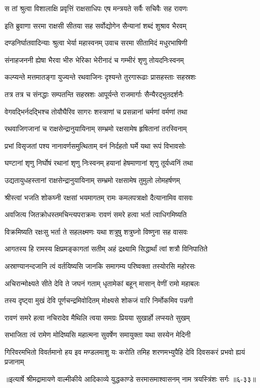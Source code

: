 \twolineshloka
{स तां श्रुत्वा विशालाक्षि प्रवृत्तिं राक्षसाधिपः}
{एष मन्त्रयते सर्वैः सचिवैः सह रावणः} %

\twolineshloka
{इति ब्रुवाणा सरमा राक्षसी सीतया सह}
{सर्वोद्योगेन सैन्यानां शब्दं शुश्राव भैरवम्} %

\twolineshloka
{दण्डनिर्घातवादिन्याः श्रुत्वा भेर्या महास्वनम्}
{उवाच सरमा सीतामिदं मधुरभाषिणी} %

\twolineshloka
{संनाहजननी ह्येषा भैरवा भीरु भेरिका}
{भेरीनादं च गम्भीरं शृणु तोयदनिःस्वनम्} %

\twolineshloka
{कल्प्यन्ते मत्तमातङ्गा युज्यन्ते रथवाजिनः}
{दृश्यन्ते तुरगारूढाः प्रासहस्ताः सहस्रशः} %

\twolineshloka
{तत्र तत्र च संनद्धाः सम्पतन्ति सहस्रशः}
{आपूर्यन्ते राजमार्गाः सैन्यैरद्भुतदर्शनैः} %

\twolineshloka
{वेगवद्भिर्नदद्भिश्च तोयौघैरिव सागरः}
{शस्त्राणां च प्रसन्नानां चर्मणां वर्मणां तथा} %

\twolineshloka
{रथवाजिगजानां च राक्षसेन्द्रानुयायिनाम्}
{सम्भ्रमो रक्षसामेष हृषितानां तरस्विनाम्} %

\twolineshloka
{प्रभां विसृजतां पश्य नानावर्णसमुत्थिताम्}
{वनं निर्दहतो घर्मे यथा रूपं विभावसोः} %

\twolineshloka
{घण्टानां शृणु निर्घोषं रथानां शृणु निःस्वनम्}
{हयानां हेषमाणानां शृणु तूर्यध्वनिं तथा} %

\twolineshloka
{उद्यतायुधहस्तानां राक्षसेन्द्रानुयायिनाम्}
{सम्भ्रमो रक्षसामेष तुमुलो लोमहर्षणम्} %

\twolineshloka
{श्रीस्त्वां भजति शोकघ्नी रक्षसां भयमागतम्}
{रामः कमलपत्राक्षो दैत्यानामिव वासवः} %

\twolineshloka
{अवजित्य जितक्रोधस्तमचिन्त्यपराक्रमः}
{रावणं समरे हत्वा भर्ता त्वाधिगमिष्यति} %

\twolineshloka
{विक्रमिष्यति रक्षःसु भर्ता ते सहलक्ष्मणः}
{यथा शत्रुषु शत्रुघ्नो विष्णुना सह वासवः} %

\twolineshloka
{आगतस्य हि रामस्य क्षिप्रमङ्कागतां सतीम्}
{अहं द्रक्ष्यामि सिद्धार्थां त्वां शत्रौ विनिपातिते} %

\twolineshloka
{अस्राण्यानन्दजानि त्वं वर्तयिष्यसि जानकि}
{समागम्य परिष्वक्ता तस्योरसि महोरसः} %

\twolineshloka
{अचिरान्मोक्ष्यते सीते देवि ते जघनं गताम्}
{धृतामेकां बहून् मासान् वेणीं रामो महाबलः} %

\twolineshloka
{तस्य दृष्ट्वा मुखं देवि पूर्णचन्द्रमिवोदितम्}
{मोक्ष्यसे शोकजं वारि निर्मोकमिव पन्नगी} %

\twolineshloka
{रावणं समरे हत्वा नचिरादेव मैथिलि}
{त्वया समग्रः प्रियया सुखार्हो लप्स्यते सुखम्} %

\twolineshloka
{सभाजिता त्वं रामेण मोदिष्यसि महात्मना}
{सुवर्षेण समायुक्ता यथा सस्येन मेदिनी} %

\twolineshloka
{गिरिवरमभितो विवर्तमानो हय इव मण्डलमाशु यः करोति}
{तमिह शरणमभ्युपैहि देवि दिवसकरं प्रभवो ह्ययं प्रजानाम्} %


॥इत्यार्षे श्रीमद्रामायणे वाल्मीकीये आदिकाव्ये युद्धकाण्डे सरमासमाश्वासनम् नाम त्रयस्त्रिंशः सर्गः ॥६-३३॥
